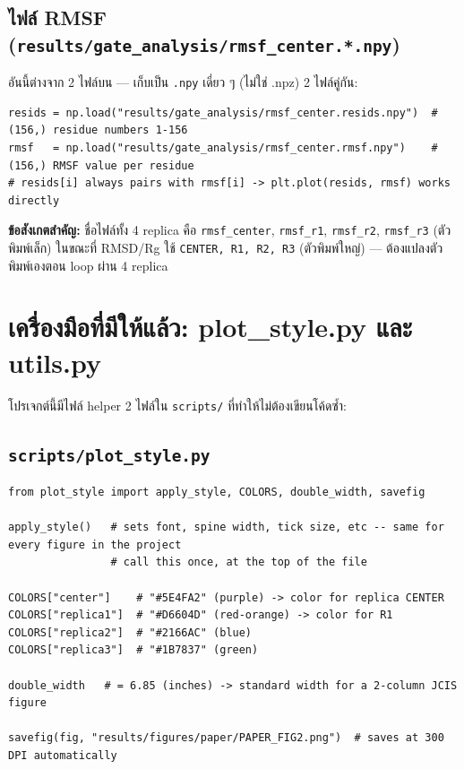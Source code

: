\documentclass[11pt,a4paper]{article}
\begin{document}
\subsection{ไฟล์ RMSF (\texttt{results/gate\_analysis/rmsf\_center.*.npy})}
อันนี้ต่างจาก 2 ไฟล์บน — เก็บเป็น \texttt{.npy} เดี่ยว ๆ (ไม่ใช่ .npz) 2 ไฟล์คู่กัน:
\begin{lstlisting}
resids = np.load("results/gate_analysis/rmsf_center.resids.npy")  # (156,) residue numbers 1-156
rmsf   = np.load("results/gate_analysis/rmsf_center.rmsf.npy")    # (156,) RMSF value per residue
# resids[i] always pairs with rmsf[i] -> plt.plot(resids, rmsf) works directly
\end{lstlisting}

\textbf{ข้อสังเกตสำคัญ:} ชื่อไฟล์ทั้ง 4 replica คือ \texttt{rmsf\_center}, \texttt{rmsf\_r1},
\texttt{rmsf\_r2}, \texttt{rmsf\_r3} (ตัวพิมพ์เล็ก) ในขณะที่ RMSD/Rg ใช้ \texttt{CENTER, R1, R2, R3}
(ตัวพิมพ์ใหญ่) — ต้องแปลงตัวพิมพ์เองตอน loop ผ่าน 4 replica

\section{เครื่องมือที่มีให้แล้ว: plot\_style.py และ utils.py}
โปรเจกต์นี้มีไฟล์ helper 2 ไฟล์ใน \texttt{scripts/} ที่ทำให้ไม่ต้องเขียนโค้ดซ้ำ:

\subsection{\texttt{scripts/plot\_style.py}}
\begin{lstlisting}
from plot_style import apply_style, COLORS, double_width, savefig

apply_style()   # sets font, spine width, tick size, etc -- same for every figure in the project
                # call this once, at the top of the file

COLORS["center"]    # "#5E4FA2" (purple) -> color for replica CENTER
COLORS["replica1"]  # "#D6604D" (red-orange) -> color for R1
COLORS["replica2"]  # "#2166AC" (blue)
COLORS["replica3"]  # "#1B7837" (green)

double_width   # = 6.85 (inches) -> standard width for a 2-column JCIS figure

savefig(fig, "results/figures/paper/PAPER_FIG2.png")  # saves at 300 DPI automatically
\end{lstlisting}
\end{document}
